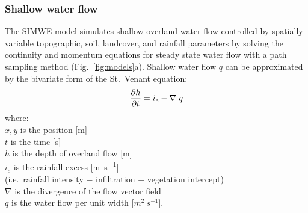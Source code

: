 \documentclass[gmd, manuscript]{copernicus}
\begin{document}



\subsubsection{Shallow water flow}

The SIMWE model
simulates shallow overland water flow
controlled by spatially variable topographic, soil, landcover, 
and rainfall parameters
by solving the continuity and momentum equations 
for steady state water flow with a path sampling method
(Fig.~\ref{fig:models}a). 
Shallow water flow $q$ can be approximated by
the bivariate form of the St.~Venant equation:
\begin{equation}
\label{eq:water}
{\partial h \over \partial t} =
 i_e - \nabla ~ q
\end{equation}
{\small
\noindent
where: \\
\noindent
\hspace*{0.5em} $x, y$ is the position [\unit{m}]\\
\hspace*{0.5em} $t$ is the time [\unit{s}] \\
\hspace*{0.5em} $h$ is the depth of overland flow [\unit{m}]\\
\hspace*{0.5em} $i_e$ is the rainfall excess [\unit{m~s^{-1}}] \\
\hspace*{0.5em} (i.e.~rainfall intensity $-$ infiltration $-$ vegetation intercept)\\
\hspace*{0.5em} $\nabla$ is the divergence of the flow vector field\\
\hspace*{0.5em} $q$ is the water flow per unit width [$\unit{m}^2~\unit{s}^{-1}$]. \\
}
\end{document}
